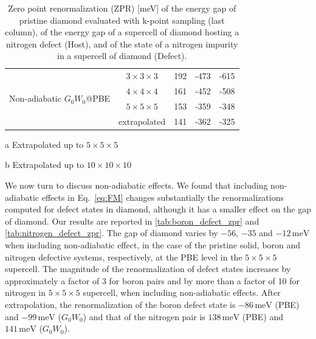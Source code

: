 \documentclass[journal=jctcce,manuscript=article]{achemso}
\begin{document}
\begin{table}[]
\begin{threeparttable}
\begin{tabular}{ccccc}
    \hline
    \multirow{4}{*}{Non-adiabatic $G_0W_0$@PBE} & $3\times 3\times 3$  & 	192  & -473                                        &  -615 \\
    & $4\times 4\times 4$  &	161 &   -452                                          &  -508 \\
    & $5\times 5\times 5$ 	& 153  &    -359                          &  -348 \\
    & extrapolated  & 141\tnote{a} & -362\tnote{a} & -325\tnote{a} \\
    \hline\hline
    \end{tabular}
    \begin{tablenotes}
    \item[a] Extrapolated up to $5\times 5\times 5$
    \item[b] Extrapolated up to $10\times 10\times 10$
    \end{tablenotes}
    \end{threeparttable}
\caption{Zero point renormalization (ZPR) [meV] of the energy gap of pristine diamond evaluated with k-point sampling (last column), of the energy gap of a supercell of diamond hosting a nitrogen defect (Host), and of the state of a nitrogen impurity in a supercell of diamond (Defect).}
    \label{tab:nitrogen_defect_zpr}
\end{table}

We now turn to discuss non-adiabatic effects. We found that including non-adiabatic effects in Eq.~\ref{eq:FM} changes substantially the renormalizations computed for defect states in diamond, although it has a smaller effect on the gap of diamond. Our results are reported in \autoref{tab:boron_defect_zpr} and \autoref{tab:nitrogen_defect_zpr}. The gap of diamond varies by $-56$, $-35$ and $-12\,\mathrm{meV}$ when including non-adiabatic effect, in the case of the pristine solid, boron and nitrogen defective systems, respectively, at the PBE level in the $5\times 5\times 5$ supercell. The magnitude of the renormalization of defect states increases by approximately a factor of 3 for boron pairs and by more than a factor of 10 for nitrogen in $5\times5\times5$ supercell, when including non-adiabatic effects. After extrapolation, the renormalization of the boron defect state is $-86\,\mathrm{meV}$ (PBE) and $-99\,\mathrm{meV}$ ($G_0W_0$) and that of the nitrogen pair is $138\,\mathrm{meV}$ (PBE) and $141\,\mathrm{meV}$  ($G_0W_0$).
\end{document}
